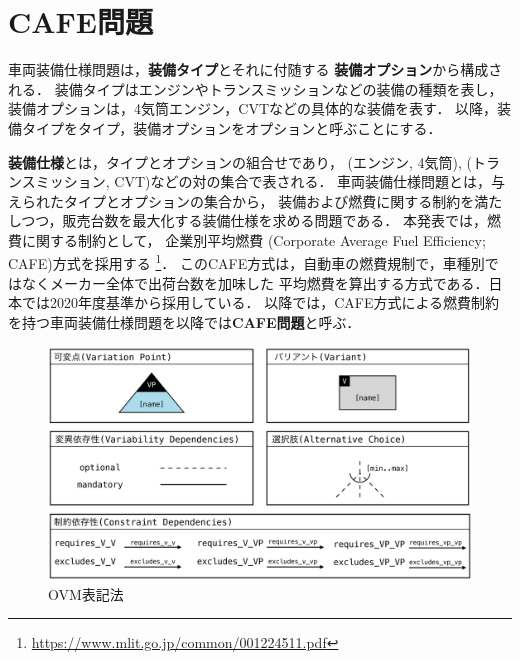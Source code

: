\section{CAFE問題}\label{sec:background}

車両装備仕様問題は，\textbf{装備タイプ}とそれに付随する
\textbf{装備オプション}から構成される．
装備タイプはエンジンやトランスミッションなどの装備の種類を表し，
装備オプションは，4気筒エンジン，CVTなどの具体的な装備を表す．
以降，装備タイプをタイプ，装備オプションをオプションと呼ぶことにする．


\textbf{装備仕様}とは，タイプとオプションの組合せであり，
(エンジン, 4気筒), (トランスミッション, CVT)などの対の集合で表される．
車両装備仕様問題とは，与えられたタイプとオプションの集合から，
装備および燃費に関する制約を満たしつつ，販売台数を最大化する装備仕様を求める問題である．
本発表では，燃費に関する制約として，
企業別平均燃費 (Corporate Average Fuel Efficiency; CAFE)方式を採用する
\footnote{\url{https://www.mlit.go.jp/common/001224511.pdf}}．
このCAFE方式は，自動車の燃費規制で，車種別ではなくメーカー全体で出荷台数を加味した
平均燃費を算出する方式である．日本では2020年度基準から採用している．
以降では，CAFE方式による燃費制約を持つ車両装備仕様問題を以降では\textbf{CAFE問題}と呼ぶ．

\begin{figure}[tb]
 \centerline {\includegraphics[width=\linewidth]{images/notation.eps}}
 \caption{OVM表記法\cite{Pohl05:sple}}
 \label{fig:ovm_notation}
\end{figure}

